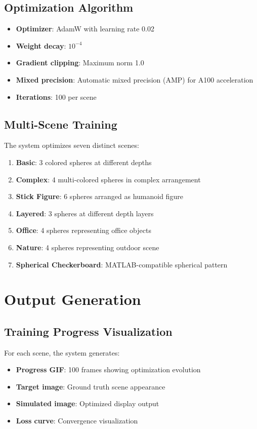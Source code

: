 \documentclass[11pt]{article}
\begin{document}
\subsection{Optimization Algorithm}
\begin{itemize}
    \item \textbf{Optimizer}: AdamW with learning rate 0.02
    \item \textbf{Weight decay}: $10^{-4}$
    \item \textbf{Gradient clipping}: Maximum norm 1.0
    \item \textbf{Mixed precision}: Automatic mixed precision (AMP) for A100 acceleration
    \item \textbf{Iterations}: 100 per scene
\end{itemize}

\subsection{Multi-Scene Training}
The system optimizes seven distinct scenes:
\begin{enumerate}
    \item \textbf{Basic}: 3 colored spheres at different depths
    \item \textbf{Complex}: 4 multi-colored spheres in complex arrangement
    \item \textbf{Stick Figure}: 6 spheres arranged as humanoid figure
    \item \textbf{Layered}: 3 spheres at different depth layers
    \item \textbf{Office}: 4 spheres representing office objects
    \item \textbf{Nature}: 4 spheres representing outdoor scene
    \item \textbf{Spherical Checkerboard}: MATLAB-compatible spherical pattern
\end{enumerate}

\section{Output Generation}

\subsection{Training Progress Visualization}
For each scene, the system generates:
\begin{itemize}
    \item \textbf{Progress GIF}: 100 frames showing optimization evolution
    \item \textbf{Target image}: Ground truth scene appearance
    \item \textbf{Simulated image}: Optimized display output
    \item \textbf{Loss curve}: Convergence visualization
\end{itemize}
\end{document}
